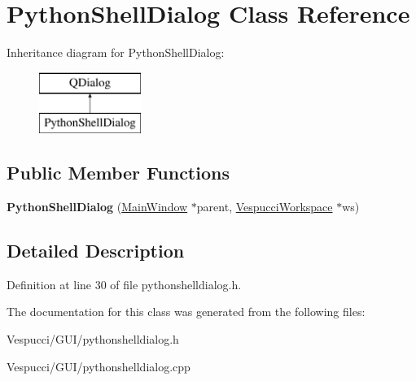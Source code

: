 \hypertarget{class_python_shell_dialog}{}\section{Python\+Shell\+Dialog Class Reference}
\label{class_python_shell_dialog}
Inheritance diagram for Python\+Shell\+Dialog\+:\begin{figure}[H]
\begin{center}
\leavevmode
\includegraphics[height=2.000000cm]{class_python_shell_dialog}
\end{center}
\end{figure}
\subsection*{Public Member Functions}
\begin{DoxyCompactItemize}
\item 
{\bfseries Python\+Shell\+Dialog} (\hyperlink{class_main_window}{Main\+Window} $\ast$parent, \hyperlink{class_vespucci_workspace}{Vespucci\+Workspace} $\ast$ws)\hypertarget{class_python_shell_dialog_ac8360b6de19a249bf9b17eab302213ff}{}\label{class_python_shell_dialog_ac8360b6de19a249bf9b17eab302213ff}

\end{DoxyCompactItemize}


\subsection{Detailed Description}


Definition at line 30 of file pythonshelldialog.\+h.



The documentation for this class was generated from the following files\+:\begin{DoxyCompactItemize}
\item 
Vespucci/\+G\+U\+I/pythonshelldialog.\+h\item 
Vespucci/\+G\+U\+I/pythonshelldialog.\+cpp\end{DoxyCompactItemize}
